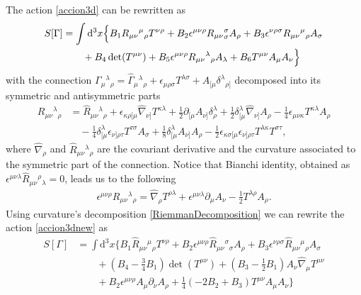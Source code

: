 \documentclass[%
  showpacs,showkeys,prd,superscriptaddress]{revtex4-1}
\def\md{{\mathrm{d}}}
\def\l{\left}
\def\r{\right}
\begin{document}
The action \eqref{accion3d} can be rewritten as 
\begin{align}
  \label{accion3dnew}
  S[\Gamma]&=\int\md^3x \Big\{ B_1R_{\mu\nu}{}^\mu{}_{\rho} T^{\nu\rho} + B_2\epsilon^{\mu\nu\rho}R_{\mu\nu}{}^{\sigma}_\sigma A_\rho + B_3\epsilon^{\nu\rho\sigma}R_{\mu\nu}{}^{\mu}{}_\rho A_\sigma\notag\\
  & \qquad + B_4 \det(T^{\mu\nu}) + B_5 \epsilon^{\mu\nu\rho}R_{\mu\nu}{}^\lambda{}_\rho A_\lambda + B_6 T^{\mu\nu}A_\mu A_\nu \Big\}
\end{align}
with the connection $\Gamma_{\mu}{}^\lambda{}_\rho=\hat\Gamma_{\mu}{}^\lambda{}_\rho+\epsilon_{\mu\rho\sigma}T^{\lambda\sigma}+A_{[\mu}\delta^\lambda{}_{\rho]}$ decomposed into its symmetric and antisymmetric parts
\begin{align}
  \label{RiemmanDecomposition}
  R_{\mu\nu}{}^\lambda{}_\rho&=
  \hat{R}_{\mu\nu}{}^\lambda{}_\rho+\epsilon_{\kappa\rho[\mu}\hat\nabla_{\nu]}T^{\kappa\lambda}+\frac{1}{2}\partial_{[\mu}A_{\nu]}\delta^\lambda_\rho+\frac{1}{2}\delta^\lambda_{[\mu}\hat\nabla_{\nu]}A_\rho-\frac{1}{4}\epsilon_{\mu\nu\kappa}T^{\kappa\lambda}A_\rho\\\nonumber
    & \quad -\frac{1}{4}\delta^\lambda_{[\mu}\epsilon_{\nu]\rho\tau}T^{\tau\sigma}A_\sigma + \frac{1}{8}\delta_{[\mu}^\lambda A_{\nu]}A_\rho-\frac{1}{2}\epsilon_{\kappa\sigma[\mu}\epsilon_{\nu]\rho\tau}T^{\lambda\kappa}T^{\sigma\tau},
\end{align}
where $ \hat\nabla_\rho$ and $\hat{R}_{\mu\nu}{}^\lambda{}_\rho$ are the covariant derivative and the curvature associated to the symmetric part of the connection.
Notice that Bianchi identity, obtained as $\epsilon^{\mu\nu\lambda}\hat R_{\mu\nu}{}^\rho{}_\lambda=0$, leads us to the following
\begin{align}
  \label{bianchi}
  \epsilon^{\mu\nu\rho} R_{\mu\nu}{}^\lambda{}_\rho = \hat\nabla_\rho T^{\rho\lambda}+\epsilon^{\mu\nu\lambda}\partial_\mu A_\nu -\frac{1}{2}T^{\lambda\rho}A_\rho. 
\end{align}
Using curvature's decomposition \eqref{RiemmanDecomposition}  we can rewrite the action \eqref{accion3dnew} as
\begin{align}
  \label{accion3dnewer}
  S[\Gamma]
  &= \int\md^3x \Bigg\{B_1\hat R_{\mu\nu}{}^\mu{}_{\rho} T^{\nu\rho}+B_2\epsilon^{\mu\nu\rho}\hat R_{\mu\nu}{}^{\sigma}{}_\sigma A_\rho+B_3\epsilon^{\nu\rho\sigma}\hat R_{\mu\nu}{}^{\mu}{}_\rho A_\sigma \nonumber\\ 
  & \qquad +\l(B_4-\frac{3}{4}B_1\r) \det(T^{\mu\nu}) + \l(B_3-\frac{1}{2}B_1\r) A_\nu\hat\nabla_\mu T^{\mu\nu}\nonumber\\ 
  & \qquad + B_2\epsilon^{\mu\nu\rho}A_\mu\partial_\nu A_\rho+\frac{1}{4}(-2B_2+B_3)T^{\mu\nu}A_\mu A_\nu\Bigg\}
\end{align}
\end{document}
